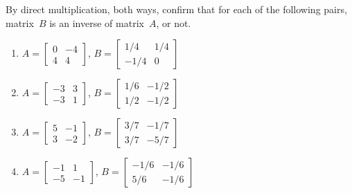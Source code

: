 \begin{comment}
Could have a section on GF(2): that is, inverses of 0-1 matrices mod 2??  Relevant to computer science encoding and encryption---somehow.  Matlab/octave supports modular computation via gf() something and some package, respectively.
\end{comment}





\sectionExercises


\begin{exercise} \label{ex:abinv} 
By direct multiplication, both ways, confirm that for each of the following pairs, matrix~\(B\) is an inverse of matrix~\(A\), or not.
\begin{enumerate}
\item \(A=\begin{bmatrix} 0&-4
\\4&4 \end{bmatrix}\), 
\(B=\begin{bmatrix} 1/4&1/4
\\-1/4&0 \end{bmatrix}\)

\item \(A=\begin{bmatrix} -3&3
\\-3&1 \end{bmatrix}\), 
\(B=\begin{bmatrix} 1/6&-1/2
\\1/2&-1/2 \end{bmatrix}\)

\item \(A=\begin{bmatrix} 5&-1
\\3&-2 \end{bmatrix}\), 
\(B=\begin{bmatrix} 3/7&-1/7
\\3/7&-5/7 \end{bmatrix}\)

\item \(A=\begin{bmatrix} -1&1
\\-5&-1 \end{bmatrix}\), 
\(B=\begin{bmatrix} -1/6&-1/6
\\5/6&-1/6 \end{bmatrix}\)


\end{enumerate}
\end{exercise}
